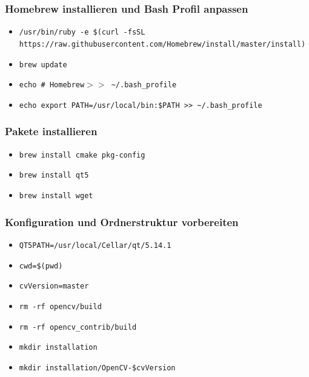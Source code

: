 \subsubsection{Homebrew installieren und Bash Profil anpassen} 
\begin{itemize}
	\item \texttt{/usr/bin/ruby -e \grqq\$(curl -fsSL \newline https://raw.githubusercontent.com/Homebrew/install/master/install)\grqq}
	\item \texttt{brew update}
	\item \texttt{echo \grqq\# Homebrew\grqq  $>$$>$ \textasciitilde/.bash\_profile}
	\item \texttt{echo \grqq export PATH=/usr/local/bin:\$PATH \grqq >> \textasciitilde/.bash\_profile}

\end{itemize}


\subsubsection{Pakete installieren} 
\begin{itemize}
	\item \texttt{brew install cmake pkg-config}
	\item \texttt{brew install qt5}
	\item \texttt{brew install wget}
	
\end{itemize}

\subsubsection{Konfiguration und Ordnerstruktur vorbereiten } 
\begin{itemize}
	\item \texttt{QT5PATH=/usr/local/Cellar/qt/5.14.1}
	\item \texttt{cwd=\$(pwd)}
	\item \texttt{cvVersion=\grqq master\grqq}
	
	\item \texttt{rm -rf opencv/build}	
	\item \texttt{rm -rf opencv\_contrib/build}
	\item \texttt{mkdir installation}
	\item \texttt{mkdir installation/OpenCV-\grqq\$cvVersion\grqq}	
	
\end{itemize}

